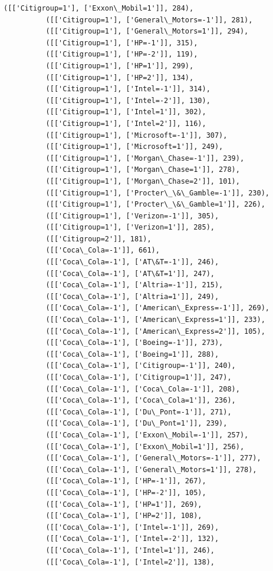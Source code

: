 \documentclass[11pt]{article}
\begin{document}
\begin{Verbatim}[commandchars=\\\{\}]
          ([['Citigroup=1'], ['Exxon\_Mobil=1']], 284),
          ([['Citigroup=1'], ['General\_Motors=-1']], 281),
          ([['Citigroup=1'], ['General\_Motors=1']], 294),
          ([['Citigroup=1'], ['HP=-1']], 315),
          ([['Citigroup=1'], ['HP=-2']], 119),
          ([['Citigroup=1'], ['HP=1']], 299),
          ([['Citigroup=1'], ['HP=2']], 134),
          ([['Citigroup=1'], ['Intel=-1']], 314),
          ([['Citigroup=1'], ['Intel=-2']], 130),
          ([['Citigroup=1'], ['Intel=1']], 302),
          ([['Citigroup=1'], ['Intel=2']], 116),
          ([['Citigroup=1'], ['Microsoft=-1']], 307),
          ([['Citigroup=1'], ['Microsoft=1']], 249),
          ([['Citigroup=1'], ['Morgan\_Chase=-1']], 239),
          ([['Citigroup=1'], ['Morgan\_Chase=1']], 278),
          ([['Citigroup=1'], ['Morgan\_Chase=2']], 101),
          ([['Citigroup=1'], ['Procter\_\&\_Gamble=-1']], 230),
          ([['Citigroup=1'], ['Procter\_\&\_Gamble=1']], 226),
          ([['Citigroup=1'], ['Verizon=-1']], 305),
          ([['Citigroup=1'], ['Verizon=1']], 285),
          ([['Citigroup=2']], 181),
          ([['Coca\_Cola=-1']], 661),
          ([['Coca\_Cola=-1'], ['AT\&T=-1']], 246),
          ([['Coca\_Cola=-1'], ['AT\&T=1']], 247),
          ([['Coca\_Cola=-1'], ['Altria=-1']], 215),
          ([['Coca\_Cola=-1'], ['Altria=1']], 249),
          ([['Coca\_Cola=-1'], ['American\_Express=-1']], 269),
          ([['Coca\_Cola=-1'], ['American\_Express=1']], 233),
          ([['Coca\_Cola=-1'], ['American\_Express=2']], 105),
          ([['Coca\_Cola=-1'], ['Boeing=-1']], 273),
          ([['Coca\_Cola=-1'], ['Boeing=1']], 288),
          ([['Coca\_Cola=-1'], ['Citigroup=-1']], 240),
          ([['Coca\_Cola=-1'], ['Citigroup=1']], 247),
          ([['Coca\_Cola=-1'], ['Coca\_Cola=-1']], 208),
          ([['Coca\_Cola=-1'], ['Coca\_Cola=1']], 236),
          ([['Coca\_Cola=-1'], ['Du\_Pont=-1']], 271),
          ([['Coca\_Cola=-1'], ['Du\_Pont=1']], 239),
          ([['Coca\_Cola=-1'], ['Exxon\_Mobil=-1']], 257),
          ([['Coca\_Cola=-1'], ['Exxon\_Mobil=1']], 256),
          ([['Coca\_Cola=-1'], ['General\_Motors=-1']], 277),
          ([['Coca\_Cola=-1'], ['General\_Motors=1']], 278),
          ([['Coca\_Cola=-1'], ['HP=-1']], 267),
          ([['Coca\_Cola=-1'], ['HP=-2']], 105),
          ([['Coca\_Cola=-1'], ['HP=1']], 269),
          ([['Coca\_Cola=-1'], ['HP=2']], 108),
          ([['Coca\_Cola=-1'], ['Intel=-1']], 269),
          ([['Coca\_Cola=-1'], ['Intel=-2']], 132),
          ([['Coca\_Cola=-1'], ['Intel=1']], 246),
          ([['Coca\_Cola=-1'], ['Intel=2']], 138),

\end{Verbatim}
\end{document}
